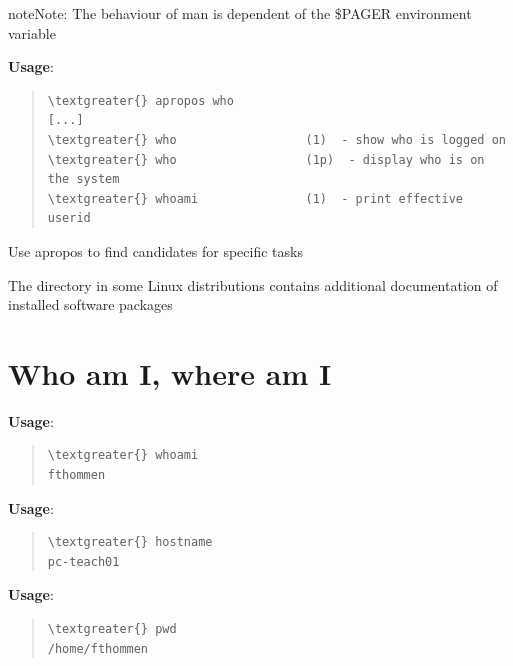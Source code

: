 \documentclass[letterpaper,10pt,english]{sphinxmanual}
\begin{document}
\begin{notice}{note}{Note:}
The behaviour of man is dependent of the \$PAGER environment variable
\end{notice}

\textbf{Usage}: 
\begin{quote}

\begin{Verbatim}[commandchars=\\\{\}]
\textgreater{} apropos who
[...]
\textgreater{} who                  (1)  - show who is logged on
\textgreater{} who                  (1p)  - display who is on the system
\textgreater{} whoami               (1)  - print effective userid
\end{Verbatim}
\end{quote}

Use apropos to find candidates for specific tasks

The  directory in some Linux distributions contains additional documentation of installed software packages


\section{Who am I, where am I}
\label{introduction:who-am-i-where-am-i}
\textbf{Usage}: 
\begin{quote}

\begin{Verbatim}[commandchars=\\\{\}]
\textgreater{} whoami
fthommen
\end{Verbatim}
\end{quote}

\textbf{Usage}: 
\begin{quote}

\begin{Verbatim}[commandchars=\\\{\}]
\textgreater{} hostname
pc-teach01
\end{Verbatim}
\end{quote}

\textbf{Usage}: 
\begin{quote}

\begin{Verbatim}[commandchars=\\\{\}]
\textgreater{} pwd
/home/fthommen
\end{Verbatim}
\end{quote}
\end{document}
